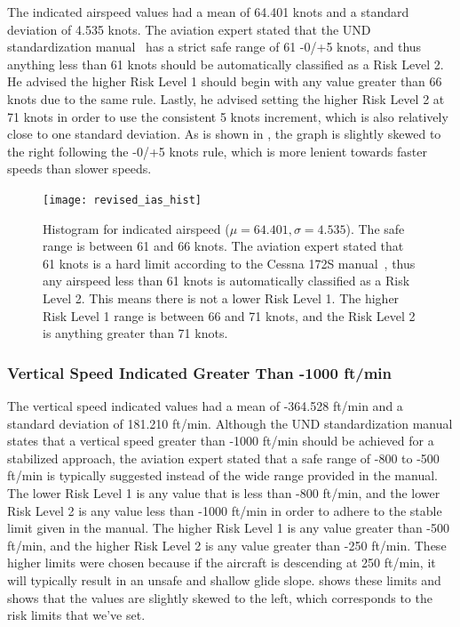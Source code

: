           The indicated airspeed values had a mean of 64.401 knots and a standard deviation of 4.535 knots.  The aviation expert stated that the UND standardization manual~\cite{und_flight_manual} has a strict safe range of 61 -0/+5 knots, and thus anything less than 61 knots should be automatically classified as a Risk Level 2.  He advised the higher Risk Level 1 should begin with any value greater than 66 knots due to the same rule.  Lastly, he advised setting the higher Risk Level 2 at 71 knots in order to use the consistent 5 knots increment, which is also relatively close to one standard deviation.  As is shown in , the graph is slightly skewed to the right following the -0/+5 knots rule, which is more lenient towards faster speeds than slower speeds.

		\begin{figure}
			\centering
            \texttt{[image: revised\_ias\_hist]}
            \caption{Histogram for indicated airspeed ($\mu = 64.401, \sigma = 4.535$).  The safe range is between 61 and 66 knots.  The aviation expert stated that 61 knots is a hard limit according to the Cessna 172S manual~\cite{und_poh}, thus any airspeed less than 61 knots is automatically classified as a Risk Level 2.  This means there is not a lower Risk Level 1.  The higher Risk Level 1 range is between 66 and 71 knots, and the Risk Level 2 is anything greater than 71 knots.}
            \label{fig:revised_ias_hist}
		\end{figure}



    \subsubsection{Vertical Speed Indicated Greater Than -1000 ft/min}
    
    	The vertical speed indicated values had a mean of -364.528 ft/min and a standard deviation of 181.210 ft/min.  Although the UND standardization manual states that a vertical speed greater than -1000 ft/min should be achieved for a stabilized approach, the aviation expert stated that a safe range of -800 to -500 ft/min is typically suggested instead of the wide range provided in the manual.  The lower Risk Level 1 is any value that is less than -800 ft/min, and the lower Risk Level 2 is any value less than -1000 ft/min in order to adhere to the stable limit given in the manual.  The higher Risk Level 1 is any value greater than -500 ft/min, and the higher Risk Level 2 is any value greater than -250 ft/min.  These higher limits were chosen because if the aircraft is descending at 250 ft/min, it will typically result in an unsafe and shallow glide slope.   shows these limits and shows that the values are slightly skewed to the left, which corresponds to the risk limits that we've set.

